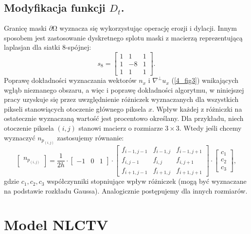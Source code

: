 \documentclass[12pt, twoside, openany]{report}
\theoremstyle{definition}
\begin{document}
\subsection{Modyfikacja funkcji $D_t$.}
\label{ssec:modDtForCrim}
Granicę maski $\partial \mathrm{\Omega }$ wyznacza się wykorzystując operację erozji i dylacji. Innym sposobem jest zastosowanie dyskretnego splotu maski z macierzą reprezentującą laplasjan dla siatki 8-spójnej: 
\begin{equation}
s_8 = 
\left[ \begin{array}{ccc}
1 & 1 & 1 \\ 
1 & -8 & 1 \\ 
1 & 1 & 1 \end{array}
\right]
\label{LAPLASJAN}
.
\end{equation}
Poprawę dokładności wyznaczania wektorów $n_x$ i $\nabla^\bot u_x$ (\autoref{4_fig3}) wnikających wgłąb nieznanego obszaru, a więc i poprawę dokładności algorytmu, w niniejszej pracy uzyskuje się przez uwzględnienie różniczek wyznaczanych dla wszystkich pikseli stanowiących otoczenie głównego piksela $x$. Wpływ każdej z różniczki na ostatecznie wyznaczaną wartość jest procentowo określany.
Dla przykładu, niech otoczenie piksela $(i, j)$ stanowi macierz o rozmiarze $3 \times 3$. Wtedy jeśli chcemy wyznaczyć $n_{p_{(i,j)}}$ zastosujemy równanie:
\[
\begin{bmatrix}
n_{p_{(i,j)}}
\end{bmatrix}
=\frac{1}{2h}
\cdot
\begin{bmatrix}
-1 & 0 & 1
\end{bmatrix}
\cdot
\begin{bmatrix}
f_{i-1, j-1} & f_{i-1, j} & f_{i-1, j+1}\\ 
f_{i,   j-1} & f_{i,   j} & f_{i,   j+1}\\
f_{i+1, j-1} & f_{i+1, j} & f_{i+1, j+1}
\end{bmatrix}
\cdot
\begin{bmatrix}
c_1\\ 
c_2\\
c_3
\end{bmatrix},
\]
gdzie $c_1, c_2, c_3$ współczynniki stopniujące wpływ różniczek (mogą być wyznaczane na podstawie rozkładu Gaussa). Analogicznie postępujemy dla innych rozmiarów.
\section{Model NLCTV}
\label{sec:smodNLCTV}
\end{document}
